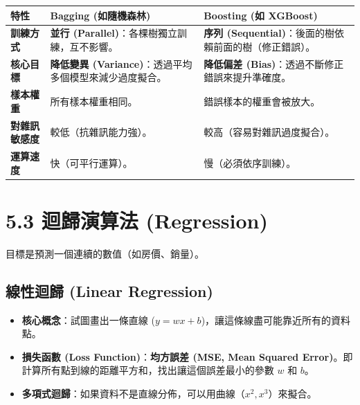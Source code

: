 \documentclass[
  letterpaper,
  DIV=11,
  numbers=noendperiod]{scrreprt}
\providecommand{\tightlist}{%
  \setlength{\itemsep}{0pt}\setlength{\parskip}{0pt}}
\begin{document}
\begin{longtable}[]{@{}
  >{\raggedright\arraybackslash}p{}
  >{\raggedright\arraybackslash}p{}
  >{\raggedright\arraybackslash}p{}@{}}
\toprule\noalign{}
\begin{minipage}[b]{\linewidth}\raggedright
特性
\end{minipage} & \begin{minipage}[b]{\linewidth}\raggedright
Bagging (如隨機森林)
\end{minipage} & \begin{minipage}[b]{\linewidth}\raggedright
Boosting (如 XGBoost)
\end{minipage} \\
\midrule\noalign{}
\endhead
\bottomrule\noalign{}
\endlastfoot
\textbf{訓練方式} & \textbf{並行 (Parallel)}：各棵樹獨立訓練，互不影響。
& \textbf{序列 (Sequential)}：後面的樹依賴前面的樹（修正錯誤）。 \\
\textbf{核心目標} & \textbf{降低變異
(Variance)}：透過平均多個模型來減少過度擬合。 & \textbf{降低偏差
(Bias)}：透過不斷修正錯誤來提升準確度。 \\
\textbf{樣本權重} & 所有樣本權重相同。 & 錯誤樣本的權重會被放大。 \\
\textbf{對雜訊敏感度} & 較低（抗雜訊能力強）。 &
較高（容易對雜訊過度擬合）。 \\
\textbf{運算速度} & 快（可平行運算）。 & 慢（必須依序訓練）。 \\
\end{longtable}

\chapter{5.3 迴歸演算法 (Regression)}\label{sec-regression}

目標是預測一個連續的數值（如房價、銷量）。

\section{線性迴歸 (Linear Regression)}\label{sec-linear-regression}

\begin{itemize}
\tightlist
\item
  \textbf{核心概念}：試圖畫出一條直線
  (\(y = wx + b\))，讓這條線盡可能靠近所有的資料點。
\item
  \textbf{損失函數 (Loss Function)}：\textbf{均方誤差 (MSE, Mean Squared
  Error)}。即計算所有點到線的距離平方和，找出讓這個誤差最小的參數 \(w\)
  和 \(b\)。
\item
  \textbf{多項式迴歸}：如果資料不是直線分佈，可以用曲線（\(x^2, x^3\)）來擬合。
\end{itemize}
\end{document}
